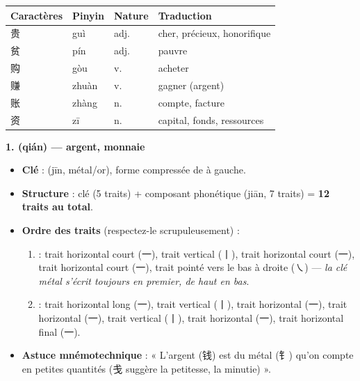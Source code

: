 \documentclass[11pt]{article}
\newcommand{\zh}[1]{\ifmmode\text{#1}\else{#1}\fi}
\begin{document}
\begin{center}
\begin{tabularx}{\linewidth}{|X|X|X|X|}
\hline
\rowcolor{popblueL} \textbf{Caractères} & \textbf{Pinyin} & \textbf{Nature} & \textbf{Traduction} \\
\hline
贵 & guì & adj. & cher, précieux, honorifique \\
贫 & pín & adj. & pauvre \\
购 & gòu & v. & acheter \\
赚 & zhuàn & v. & gagner (argent) \\
账 & zhàng & n. & compte, facture \\
资 & zī & n. & capital, fonds, ressources \\
\hline
\end{tabularx}
\end{center}

\medskip

\textbf{1. \zh{钱} (qián) — argent, monnaie}\par
\begin{itemize}
\item \textbf{Clé} : \zh{钅} (jīn, métal/or), forme compressée de \zh{金} à gauche.
\item \textbf{Structure} : clé \zh{钅} (5 traits) + composant phonétique \zh{戋} (jiān, 7 traits) = \textbf{12 traits au total}.
\item \textbf{Ordre des traits} (respectez-le scrupuleusement) :
\begin{enumerate}
\item \zh{钅} : trait horizontal court (一), trait vertical (丨), trait horizontal court (一), trait horizontal court (一), trait pointé vers le bas à droite (㇏) — \emph{la clé métal s'écrit toujours en premier, de haut en bas}.
\item \zh{戋} : trait horizontal long (一), trait vertical (丨), trait horizontal (一), trait horizontal (一), trait vertical (丨), trait horizontal (一), trait horizontal final (一).
\end{enumerate}
\item \textbf{Astuce mnémotechnique} : « L'argent (钱) est du métal (钅) qu'on compte en petites quantités (戋 suggère la petitesse, la minutie) ».
\end{itemize}
\end{document}
